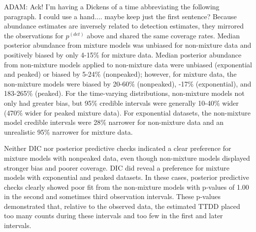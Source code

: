 \documentclass[useAMS,usenatbib,referee,12pt]{article}
\newcommand{\adam}[1]{{\color{blue} ADAM: #1}}
\begin{document}
\adam{Ack!  I'm having a Dickens of a time abbreviating the following paragraph.  I could use a hand.... maybe keep just the first sentence?}
Because abundance estimates are inversely related to detection estimates, they mirrored the observations for $p^{(det)}$ above and shared the same coverage rates.  
Median posterior abundance from mixture models was unbiased for non-mixture data and positively biased by only 4-15\% for mixture data.  
Median posterior abundance from non-mixture models applied to non-mixture data were unbiased (exponential and peaked) or biased by 5-24\% (nonpeaked); however, for mixture data, the non-mixture models were biased by 20-60\% (nonpeaked), -17\% (exponential), and 183-265\% (peaked).  
For the time-varying distributions, non-mixture models not only had greater bias, but 95\% credible intervals were generally 10-40\% wider (470\% wider for peaked mixture data).
For exponential datasets, the non-mixture model credible intervals were 28\% narrower for non-mixture data and an unrealistic 95\% narrower for mixture data.

Neither DIC nor posterior predictive checks indicated a clear preference for mixture models with nonpeaked data, even though non-mixture models displayed stronger bias and poorer coverage.  DIC did reveal a preference for mixture models with exponential and peaked datasets.  In these cases, posterior predictive checks clearly showed poor fit from the non-mixture models with p-values of 1.00 in the second and sometimes third observation intervals.  These p-values demonstrated that, relative to the observed data, the estimated TTDD placed too many counts during these intervals and too few in the first and later intervals.






\end{document}
